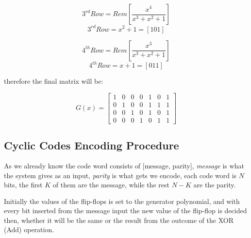 \documentclass[a4paper,12pt]{report}
\begin{document}
{{{\begin{itemize}
        \begin{equation*}
            3^{rd} Row = Rem \left[ \frac{x^{4}}{ x^3 + x^2 +1} \right]
        \end{equation*}
        \begin{equation*}
            3^{rd} Row = x^2 +1 = [1 0 1]
        \end{equation*}

        \begin{equation*}
            4^{th} Row = Rem \left[ \frac{x^{3}}{ x^3 + x^2 +1} \right]
        \end{equation*}
        \begin{equation*}
            4^{th} Row = x +1 = [0 1 1]
        \end{equation*}

        therefore the final matrix will be:

        \begin{equation*}
            G(x) = \left[ 
                \begin{matrix}
                1 & 0 & 0 & 0 & 1 & 0 & 1\\
                0 & 1 & 0 & 0 & 1 & 1 & 1 \\
                0 & 0 & 1 & 0 & 1 & 0 & 1 \\
                0 & 0 & 0 & 1 & 0 & 1 & 1                
                \end{matrix}
               \right]
        \end{equation*}


    \end{itemize}

    \subsection{Cyclic Codes Encoding Procedure}
    As we already know the code word consists of [message, parity], \textit{message} is what the system gives
        as an input, \textit{parity} is what gets we encode, each code word is $N$ bits,
        the first $K$ of them are the message, while the rest $N-K$ are the parity.
    
    Initially the values of the flip-flops is set to the generator polynomial, and with every bit
        inserted from the message input the new value of the flip-flop is decided then, whether it will 
        be the same or the result from the outcome of the XOR (Add) operation.

}}}
\end{document}
